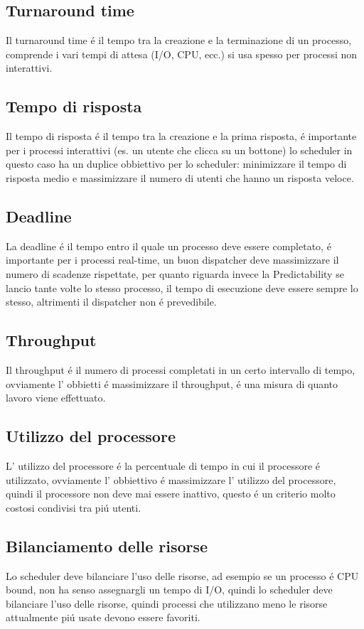     \subsection{Turnaround time}
    Il turnaround time é il tempo tra la creazione e la terminazione di un processo, comprende i vari tempi di attesa (I/O, CPU, ecc.)
    si usa spesso per processi non interattivi.
    \subsection{Tempo di risposta}
    Il tempo di risposta é il tempo tra la creazione e la prima risposta, é importante per i processi interattivi (es. un utente che clicca su un bottone)
    lo scheduler in questo caso ha un duplice obbiettivo per lo scheduler: minimizzare il tempo di risposta medio
    e massimizzare il numero di utenti che hanno un risposta veloce.
    \subsection{Deadline}
    La deadline é il tempo entro il quale un processo deve essere completato, é importante per i processi real-time,
    un buon dispatcher deve massimizzare il numero di scadenze rispettate, per quanto riguarda invece la Predictability
    se lancio tante volte lo stesso processo, il tempo di esecuzione deve essere sempre lo stesso, altrimenti il
    dispatcher non é prevedibile.
    \subsection{Throughput}
    Il throughput é il numero di processi completati in un certo intervallo di tempo, ovviamente l' obbietti é massimizzare
    il throughput, é una misura di quanto lavoro viene effettuato.
    \subsection{Utilizzo del processore}
    L' utilizzo del processore é la percentuale di tempo in cui il processore é utilizzato, ovviamente l' obbiettivo é massimizzare
    l' utilizzo del processore, quindi il processore non deve mai essere inattivo, questo é un criterio molto costosi condivisi
    tra piú utenti.
    \subsection{Bilanciamento delle risorse}
    Lo scheduler deve bilanciare l'uso delle risorse, ad esempio se un processo é CPU bound, non ha senso assegnargli un
    tempo di I/O, quindi lo scheduler deve bilanciare l'uso delle risorse, quindi processi che utilizzano meno le risorse attualmente
    piú usate devono essere favoriti.

